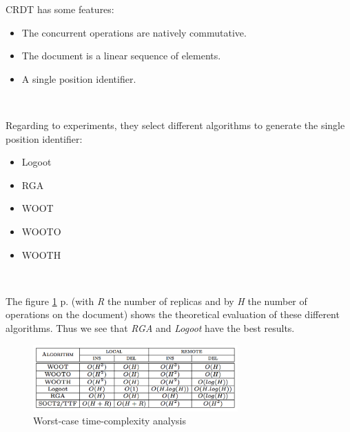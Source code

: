 CRDT has some features:
\begin{itemize}
	\item The concurrent operations are natively commutative.
	\item The document is a linear sequence of elements.
	\item A single position identifier.
\end{itemize}~

Regarding to experiments, they select different algorithms to generate the single position identifier:
\begin{itemize}
	\item Logoot
	\item RGA
	\item WOOT
	\item WOOTO
	\item WOOTH
\end{itemize}~

The figure \ref{fig:worst} p.\pageref{fig:worst} (with \emph{R} the number of replicas and by \emph{H} the number of operations on the document) shows the theoretical evaluation of these different algorithms. Thus we see that \emph{RGA} and \emph{Logoot} have the best results.

\begin{figure}[h]
  \center
  \includegraphics[width=0.7\textwidth]{includes/worst.png}
  \caption{Worst-case time-complexity analysis}
  \label{fig:worst}
\end{figure}